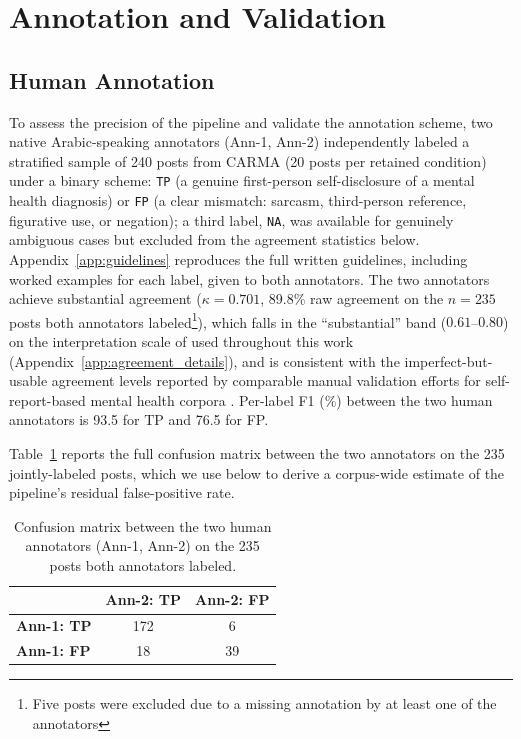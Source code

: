 \documentclass[11pt]{article}
\begin{document}
\section{Annotation and Validation}
\label{sec:annotation}

\subsection{Human Annotation}
\label{subsec:human_annotation}
To assess the precision of the pipeline and validate the annotation
scheme, two native Arabic-speaking annotators (Ann-1, Ann-2)
independently labeled a stratified sample of 240 posts from CARMA (20
posts per retained condition) under a binary scheme:
\texttt{TP} (a genuine first-person self-disclosure of a mental health
diagnosis) or \texttt{FP} (a clear mismatch:
sarcasm, third-person reference, figurative use, or negation); a third
label, \texttt{NA}, was available for genuinely ambiguous cases but
excluded from the agreement statistics below. Appendix~\ref{app:guidelines}
reproduces the full written guidelines, including worked examples for
each label, given to both annotators. The two annotators achieve substantial agreement ($\kappa = 0.701$,
89.8\% raw agreement on the $n{=}235$ posts both annotators labeled\footnote{Five posts were excluded due to a missing annotation by at least one of the annotators}),
which falls in the ``substantial'' band ($0.61$--$0.80$) on the
interpretation scale of \citet{landis1977measurement} used throughout this
work (Appendix~\ref{app:agreement_details}), and is consistent with the imperfect-but-usable
agreement levels reported by comparable manual validation efforts for
self-report-based mental health corpora \citep{cohan-etal-2018-smhd}. Per-label F1 (\%) between the two human annotators is 93.5 for TP and 76.5 for FP.


Table~\ref{tab:iaa_confusion} reports the full confusion matrix between
the two annotators on the 235 jointly-labeled posts, which we use below
to derive a corpus-wide estimate of the pipeline's residual
false-positive rate.

\begin{table}[h]
\centering
\small
\begin{tabular}{lcc}
\toprule
 & \textbf{Ann-2: TP} & \textbf{Ann-2: FP} \\
\midrule
\textbf{Ann-1: TP} & 172 & 6 \\
\textbf{Ann-1: FP} & 18 & 39 \\
\bottomrule
\end{tabular}
\caption{Confusion matrix between the two human annotators (Ann-1,
Ann-2) on the 235 posts both annotators labeled.}
\label{tab:iaa_confusion}
\end{table}
\end{document}
